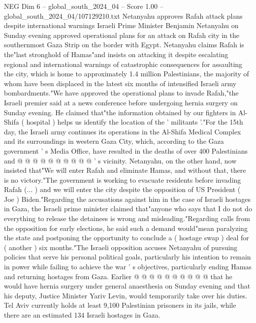 \begin{textsample}{NEG Dim 6 – global\_south\_2024\_04 – Score 1.00 – global\_south\_2024\_04/107129210.txt}  \label{ex:f6_neg_334}
Netanyahu approves Rafah attack plans despite international warnings Israeli Prime Minister Benjamin Netanyahu on Sunday evening approved operational plans for an attack on Rafah city in the southernmost Gaza Strip on the border with Egypt.
Netanyahu claims Rafah is the"last stronghold of Hamas"and insists on attacking it despite escalating regional and international warnings of catastrophic consequences for assaulting the city, which is home to approximately 1.4 million Palestinians, the majority of whom have been displaced in the latest six months of intensified Israeli army bombardments."We have approved the operational plans to invade Rafah,"the Israeli premier said at a news conference before undergoing hernia surgery on Sunday evening.
He claimed that"the information obtained by our fighters in Al-Shifa ( hospital ) helps us identify the location of the ' militants '."For the 15th day, the Israeli army continues its operations in the Al-Shifa Medical Complex and its surroundings in western Gaza City, which, according to the Gaza government ' s Media Office, have resulted in the deaths of over 400 Palestinians and @ @ @ @ @ @ @ @ @ @ ' s vicinity.
Netanyahu, on the other hand, now insisted that"We will enter Rafah and eliminate Hamas, and without that, there is no victory."The government is working to evacuate residents before invading Rafah (... ) and we will enter the city despite the opposition of US President ( Joe ) Biden."Regarding the accusations against him in the case of Israeli hostages in Gaza, the Israeli prime minister claimed that"anyone who says that I do not do everything to release the detainees is wrong and misleading."Regarding calls from the opposition for early elections, he said such a demand would"mean paralyzing the state and postponing the opportunity to conclude a ( hostage swap ) deal for ( another ) six months."The Israeli opposition accuses Netanyahu of pursuing policies that serve his personal political goals, particularly his intention to remain in power while failing to achieve the war ' s objectives, particularly ending Hamas and returning hostages from Gaza.
Earlier @ @ @ @ @ @ @ @ @ @ that he would have hernia surgery under general anaesthesia on Sunday evening and that his deputy, Justice Minister Yariv Levin, would temporarily take over his duties.
Tel Aviv currently holds at least 9,100 Palestinian prisoners in its jails, while there are an estimated 134 Israeli hostages in Gaza.

\end{textsample}
